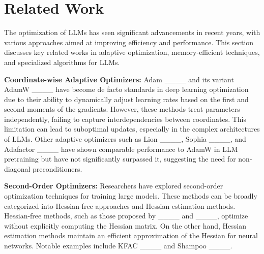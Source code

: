 \section{Related Work}
The optimization of LLMs has seen significant advancements in recent years, with various approaches aimed at improving efficiency and performance. This section discusses key related works in adaptive optimization, memory-efficient techniques, and specialized algorithms for LLMs.

\noindent\textbf{Coordinate-wise Adaptive Optimizers:} Adam ____ and its variant AdamW ____ have become de facto standards in deep learning optimization due to their ability to dynamically adjust learning rates based on the first and second moments of the gradients. However, these methods treat parameters independently, failing to capture interdependencies between coordinates. This limitation can lead to suboptimal updates, especially in the complex architectures of LLMs. Other adaptive optimizers such as Lion ____, Sophia ____, and Adafactor ____ have shown comparable performance to AdamW in LLM pretraining but have not significantly surpassed it, suggesting the need for non-diagonal preconditioners.

\noindent\textbf{Second-Order Optimizers:} Researchers have explored second-order optimization techniques for training large models. These methods can be broadly categorized into Hessian-free approaches and Hessian estimation methods. Hessian-free methods, such as those proposed by ____ and ____, optimize without explicitly computing the Hessian matrix. On the other hand, Hessian estimation methods maintain an efficient approximation of the Hessian for neural networks. Notable examples include KFAC ____ and Shampoo ____.

